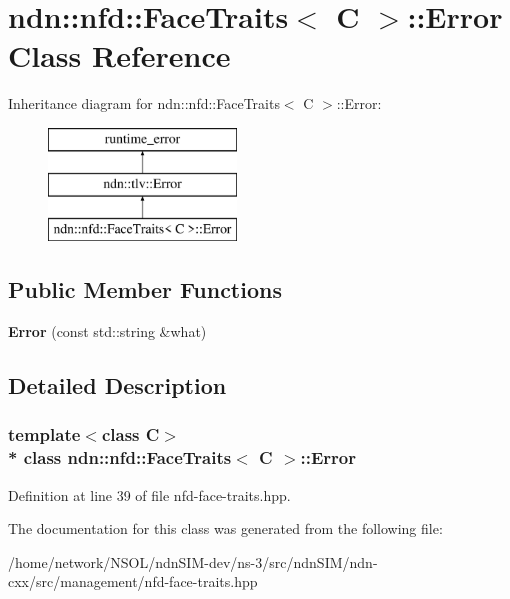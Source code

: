 \hypertarget{classndn_1_1nfd_1_1FaceTraits_1_1Error}{}\section{ndn\+:\+:nfd\+:\+:Face\+Traits$<$ C $>$\+:\+:Error Class Reference}
\label{classndn_1_1nfd_1_1FaceTraits_1_1Error}
Inheritance diagram for ndn\+:\+:nfd\+:\+:Face\+Traits$<$ C $>$\+:\+:Error\+:\begin{figure}[H]
\begin{center}
\leavevmode
\includegraphics[height=3.000000cm]{classndn_1_1nfd_1_1FaceTraits_1_1Error}
\end{center}
\end{figure}
\subsection*{Public Member Functions}
\begin{DoxyCompactItemize}
\item 
{\bfseries Error} (const std\+::string \&what)\hypertarget{classndn_1_1nfd_1_1FaceTraits_1_1Error_aec1b5bde63c9ab3a5bbeb2f8547a4c75}{}\label{classndn_1_1nfd_1_1FaceTraits_1_1Error_aec1b5bde63c9ab3a5bbeb2f8547a4c75}

\end{DoxyCompactItemize}


\subsection{Detailed Description}
\subsubsection*{template$<$class C$>$\\*
class ndn\+::nfd\+::\+Face\+Traits$<$ C $>$\+::\+Error}



Definition at line 39 of file nfd-\/face-\/traits.\+hpp.



The documentation for this class was generated from the following file\+:\begin{DoxyCompactItemize}
\item 
/home/network/\+N\+S\+O\+L/ndn\+S\+I\+M-\/dev/ns-\/3/src/ndn\+S\+I\+M/ndn-\/cxx/src/management/nfd-\/face-\/traits.\+hpp\end{DoxyCompactItemize}
